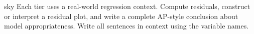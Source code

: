 \documentclass[10pt]{article}
\begin{document}
\namepartnerperiod

\vspace{0.18in}

\begin{scenariobox}[Directions]{sky}
\small
Each tier uses a real-world regression context. Compute residuals, construct or interpret a
residual plot, and write a complete AP-style conclusion about model appropriateness. Write
all sentences in context using the variable names.
\end{scenariobox}

\vspace{0.12in}

\end{document}

